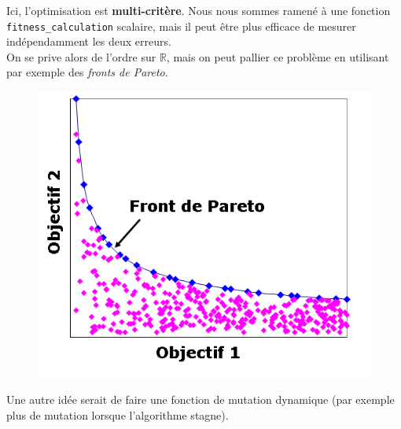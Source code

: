 \documentclass[graphics]{beamer}
\begin{document}
\begin{frame}
Ici, l'optimisation est \textbf{multi-critère}. Nous nous sommes ramené à une fonction \texttt{fitness_calculation} scalaire, mais il peut être plus efficace de mesurer indépendamment les deux erreurs. \\
On se prive alors de l'ordre sur $\mathbb{R}$, mais on peut pallier ce problème en utilisant par exemple des \textit{fronts de Pareto}.
\begin{figure}[H]
	\centering
	\includegraphics[scale=0.3]{pareto}
\end{figure}

Une autre idée serait de faire une fonction de mutation dynamique (par exemple plus de mutation lorsque l'algorithme stagne).
\end{frame}
\end{document}
